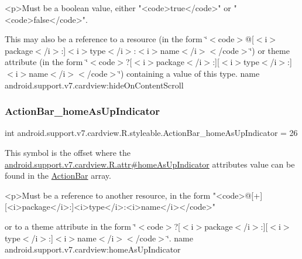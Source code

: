 \begin{DoxyVerb}      <p>Must be a boolean value, either "<code>true</code>" or "<code>false</code>".
\end{DoxyVerb}
 

This may also be a reference to a resource (in the form \char`\"{}$<$code$>$@\mbox{[}$<$i$>$package$<$/i$>$\+:\mbox{]}$<$i$>$type$<$/i$>$\+:$<$i$>$name$<$/i$>$$<$/code$>$\char`\"{}) or theme attribute (in the form \char`\"{}$<$code$>$?\mbox{[}$<$i$>$package$<$/i$>$\+:\mbox{]}\mbox{[}$<$i$>$type$<$/i$>$\+:\mbox{]}$<$i$>$name$<$/i$>$$<$/code$>$\char`\"{}) containing a value of this type.  name android.\+support.\+v7.\+cardview\+:hide\+On\+Content\+Scroll \mbox{\label{classandroid_1_1support_1_1v7_1_1cardview_1_1R_1_1styleable_af771f315212061116d74e39926bb0c86}} 
\subsubsection{\texorpdfstring{Action\+Bar\+\_\+home\+As\+Up\+Indicator}{ActionBar\_homeAsUpIndicator}}
{\footnotesize\ttfamily int android.\+support.\+v7.\+cardview.\+R.\+styleable.\+Action\+Bar\+\_\+home\+As\+Up\+Indicator = 26\hspace{0.3cm}{\ttfamily [static]}}

This symbol is the offset where the \hyperlink{classandroid_1_1support_1_1v7_1_1cardview_1_1R_1_1attr_a3d5f180614304935612a39e384a7c14a}{android.\+support.\+v7.\+cardview.\+R.\+attr\#home\+As\+Up\+Indicator} attribute\textquotesingle{}s value can be found in the \hyperlink{classandroid_1_1support_1_1v7_1_1cardview_1_1R_1_1styleable_a0cbf7f776e31f78bb0a2b558daf176f8}{Action\+Bar} array.

\begin{DoxyVerb}      <p>Must be a reference to another resource, in the form "<code>@[+][<i>package</i>:]<i>type</i>:<i>name</i></code>"
\end{DoxyVerb}
 or to a theme attribute in the form \char`\"{}$<$code$>$?\mbox{[}$<$i$>$package$<$/i$>$\+:\mbox{]}\mbox{[}$<$i$>$type$<$/i$>$\+:\mbox{]}$<$i$>$name$<$/i$>$$<$/code$>$\char`\"{}.  name android.\+support.\+v7.\+cardview\+:home\+As\+Up\+Indicator \mbox{\label{classandroid_1_1support_1_1v7_1_1cardview_1_1R_1_1styleable_adb2700c3e0cd5e075ed4921d7c014d2b}} 
